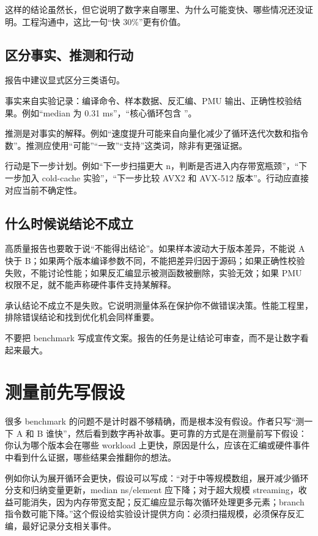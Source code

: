 这样的结论虽然长，但它说明了数字来自哪里、为什么可能变快、哪些情况还没证明。工程沟通中，这比一句“快 30\%”更有价值。

\subsection{区分事实、推测和行动}

报告中建议显式区分三类语句。

事实来自实验记录：编译命令、样本数据、反汇编、PMU 输出、正确性校验结果。例如“median 为 0.31 ms”，“核心循环包含 ”。

推测是对事实的解释。例如“速度提升可能来自向量化减少了循环迭代次数和指令数”。推测应使用“可能”“一致”“支持”这类词，除非有更强证据。

行动是下一步计划。例如“下一步扫描更大 n，判断是否进入内存带宽瓶颈”，“下一步加入 cold-cache 实验”，“下一步比较 AVX2 和 AVX-512 版本”。行动应直接对应当前不确定性。

\subsection{什么时候说结论不成立}

高质量报告也要敢于说“不能得出结论”。如果样本波动大于版本差异，不能说 A 快于 B；如果两个版本编译参数不同，不能把差异归因于源码；如果正确性校验失败，不能讨论性能；如果反汇编显示被测函数被删除，实验无效；如果 PMU 权限不足，就不能声称硬件事件支持某解释。

承认结论不成立不是失败。它说明测量体系在保护你不做错误决策。性能工程里，排除错误结论和找到优化机会同样重要。

\begin{warningbox}
不要把 benchmark 写成宣传文案。报告的任务是让结论可审查，而不是让数字看起来最大。
\end{warningbox}

\section{测量前先写假设}

很多 benchmark 的问题不是计时器不够精确，而是根本没有假设。作者只写“测一下 A 和 B 谁快”，然后看到数字再补故事。更可靠的方式是在测量前写下假设：你认为哪个版本会在哪些 workload 上更快，原因是什么，应该在汇编或硬件事件中看到什么证据，哪些结果会推翻你的想法。

例如你认为展开循环会更快，假设可以写成：“对于中等规模数组，展开减少循环分支和归纳变量更新，median ns/element 应下降；对于超大规模 streaming，收益可能消失，因为内存带宽支配；反汇编应显示每次循环处理更多元素；branch 指令数可能下降。”这个假设给实验设计提供方向：必须扫描规模，必须保存反汇编，最好记录分支相关事件。

